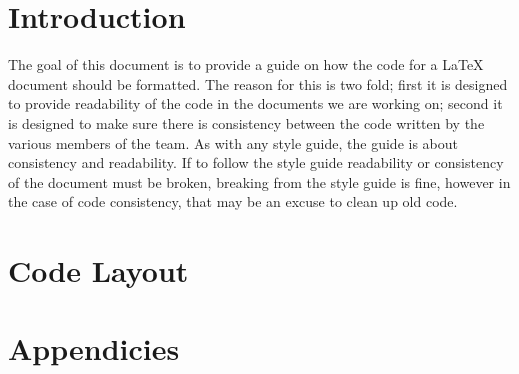 
    \tableofcontents
    \listoffigures
    \listoftables


    \section{Introduction}
    The goal of this document is to provide a guide on how the code for
    a \LaTeX{} document should be formatted. The reason for this is two
    fold; first it is designed to provide readability of the code in the
    documents we are working on; second it is designed to make sure
    there is consistency between the code written by the various members
    of the team. As with any style guide, the guide is about consistency
    and readability. If to follow the style guide readability or
    consistency of the document must be broken, breaking from the style
    guide is fine, however in the case of code consistency, that may be
    an excuse to clean up old code.



    \section{Code Layout}



    \appendix
    \section*{Appendicies}

    
    

    \begin{versionhistory}
    \end{versionhistory}



